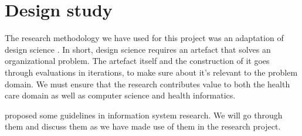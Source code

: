 

\section{Design study}
The research methodology we have used for this project was an adaptation of design science \parencite{Hevner2004}.  In short, design science requires an artefact that solves an organizational problem. The artefact itself and the construction of it goes through evaluations in iterations, to make sure about it's relevant to the problem domain. We must ensure that the research contributes value to both the health care domain as well as computer science and health informatics.

\textcite{Hevner2004} proposed some guidelines in information system research. We will go through them and discuss them as we have made use of them in the research project.

